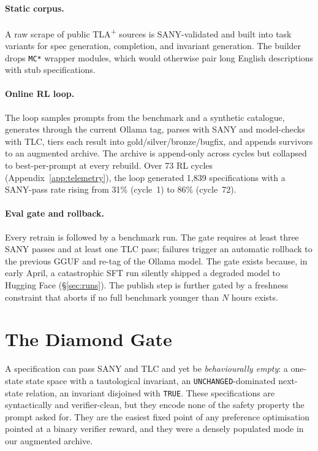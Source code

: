 \documentclass[11pt]{article}
\begin{document}
\paragraph{Static corpus.}
A raw scrape of public TLA\textsuperscript{+} sources is
SANY-validated and built into task variants for spec generation,
completion, and invariant generation.  The builder drops \texttt{MC*}
wrapper modules, which would otherwise pair long English descriptions
with stub specifications.

\paragraph{Online RL loop.}
The loop samples prompts from the benchmark and a synthetic
catalogue, generates through the current Ollama tag, parses with SANY
and model-checks with TLC, tiers each result into
gold/silver/bronze/bugfix, and appends survivors to an augmented
archive.  The archive is append-only across cycles but collapsed to
best-per-prompt at every rebuild.  Over 73 RL cycles
(Appendix~\ref{app:telemetry}), the loop generated 1{,}839
specifications with a SANY-pass rate rising from 31\% (cycle~1) to
86\% (cycle~72).

\paragraph{Eval gate and rollback.}
Every retrain is followed by a benchmark run.  The gate requires at
least three SANY passes and at least one TLC pass; failures trigger
an automatic rollback to the previous GGUF and re-tag of the Ollama
model.  The gate exists because, in early April, a catastrophic SFT
run silently shipped a degraded model to Hugging Face
(\S\ref{sec:runs}).  The publish step is further gated by a freshness
constraint that aborts if no full benchmark younger than $N$ hours
exists.

\section{The Diamond Gate}
\label{sec:diamond}

A specification can pass SANY and TLC and yet be \emph{behaviourally
empty}: a one-state state space with a tautological invariant, an
\texttt{UNCHANGED}-dominated next-state relation, an invariant
disjoined with \texttt{TRUE}.  These specifications are syntactically
and verifier-clean, but they encode none of the safety property the
prompt asked for.  They are the easiest fixed point of any preference
optimisation pointed at a binary verifier reward, and they were a
densely populated mode in our augmented archive.
\end{document}
